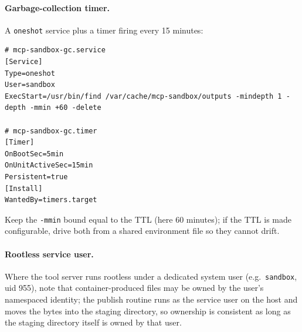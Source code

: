 \documentclass[11pt]{article}
\begin{document}
\paragraph{Garbage-collection timer.} A \texttt{oneshot} service plus a timer firing every 15 minutes:
\begin{lstlisting}[style=code]
# mcp-sandbox-gc.service
[Service]
Type=oneshot
User=sandbox
ExecStart=/usr/bin/find /var/cache/mcp-sandbox/outputs -mindepth 1 -depth -mmin +60 -delete

# mcp-sandbox-gc.timer
[Timer]
OnBootSec=5min
OnUnitActiveSec=15min
Persistent=true
[Install]
WantedBy=timers.target
\end{lstlisting}
Keep the \texttt{-mmin} bound equal to the TTL (here 60 minutes); if the TTL is made configurable, drive both from a shared environment file so they cannot drift.

\paragraph{Rootless service user.} Where the tool server runs rootless under a dedicated system user (e.g.\ \texttt{sandbox}, uid 955), note that container-produced files may be owned by the user's namespaced identity; the publish routine runs as the service user on the host and moves the bytes into the staging directory, so ownership is consistent as long as the staging directory itself is owned by that user.
\end{document}
